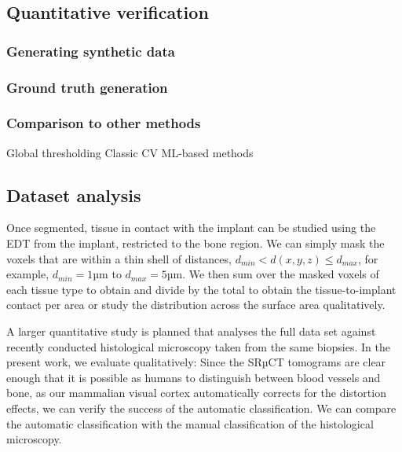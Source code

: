\subsection{Quantitative verification}
\subsubsection{Generating synthetic data}
\subsubsection{Ground truth generation}
\subsubsection{Comparison to other methods}
Global thresholding
Classic CV
ML-based methods

\subsection{Dataset analysis}

Once segmented, tissue in contact with the implant can be studied using the EDT
from the implant, restricted to the bone region. We can simply mask the voxels
that are within a thin shell of distances, $d_{min} < d(x,y,z) \le d_{max}$,
for example, $d_{min} = 1 \text{µm}$ to $d_{max} = 5 \text{µm}$. We then sum
over the masked voxels of each tissue type to obtain and divide by the total to
obtain the tissue-to-implant contact per area or study the distribution across
the surface area qualitatively.

A larger quantitative study is planned that analyses the full data set against
recently conducted histological microscopy taken from the same biopsies. In the
present work, we evaluate qualitatively: Since the SRµCT tomograms are clear
enough that it is possible as humans to distinguish between blood vessels and
bone, as our mammalian visual cortex automatically corrects for the distortion
effects, we can verify the success of the automatic classification. We can
compare the automatic classification with the manual classification of the
histological microscopy.

